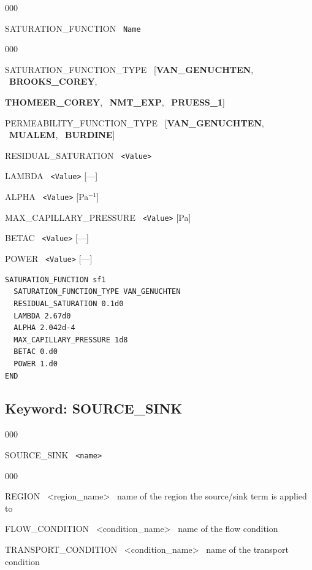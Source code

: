 \documentclass[12pt]{article}
\begin{document}

\begin{deflist}{000}
\item[SATURATION\_FUNCTION] \ {\tt Name}

\begin{deflist}{000}
\item[SATURATION\_FUNCTION\_TYPE] \ [{\bf VAN\_GENUCHTEN}, \ {\bf BROOKS\_COREY}, 

{\bf THOMEER\_COREY}, \ {\bf NMT\_EXP}, \ {\bf PRUESS\_1}]
\item[PERMEABILITY\_FUNCTION\_TYPE] \ [{\bf VAN\_GENUCHTEN}, \ {\bf MUALEM}, \ {\bf BURDINE}]
\item[RESIDUAL\_SATURATION] \ {\tt <Value>}
\item[LAMBDA] \ {\tt <Value>} [---]
\item[ALPHA] \ {\tt <Value>} [Pa$^{-1}$]
\item[MAX\_CAPILLARY\_PRESSURE] \ {\tt <Value>} [Pa]
\item[BETAC] \ {\tt <Value>} [---]
\item[POWER] \ {\tt <Value>} [---]
\end{deflist}
\item[\keyend]
\end{deflist}


\begin{mdframed}

\begin{verbatim}
SATURATION_FUNCTION sf1
  SATURATION_FUNCTION_TYPE VAN_GENUCHTEN
  RESIDUAL_SATURATION 0.1d0
  LAMBDA 2.67d0
  ALPHA 2.042d-4
  MAX_CAPILLARY_PRESSURE 1d8
  BETAC 0.d0
  POWER 1.d0
END
\end{verbatim}

\end{mdframed}

\hyperlink{target_key}{\return}


\newpage
\protect\hypertarget{target_src}{}

\subsection{Keyword: SOURCE\_SINK}
\begin{deflist}{000}
\item[SOURCE\_SINK] \ {\tt <name>}
\begin{deflist}{000}
\item[REGION] \ <region\_name> \ name of the region the source/sink term is applied to
\item[FLOW\_CONDITION] \ <condition\_name> \ name of the flow condition
\item[TRANSPORT\_CONDITION] \ <condition\_name> \ name of the transport condition
\end{deflist}
\item[\keyend]
\end{deflist}
\end{document}
